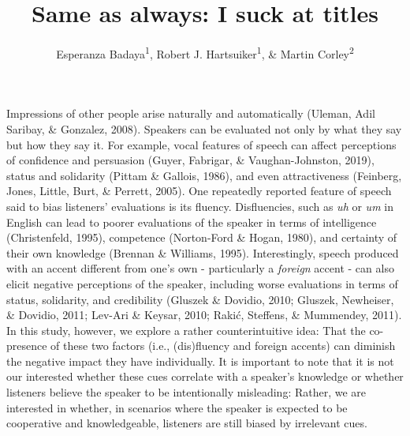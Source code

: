 \documentclass[
  man,floatsintext]{apa6}
\title{Same as always: I suck at titles}
\author{Esperanza Badaya\textsuperscript{1}, Robert J. Hartsuiker\textsuperscript{1}, \& Martin Corley\textsuperscript{2}}
\date{}
\affiliation{\vspace{0.5cm}\textsuperscript{1} Ghent University\\\textsuperscript{2} University of Edinburgh}
\begin{document}
\maketitle

Impressions of other people arise naturally and automatically (Uleman, Adil Saribay, \& Gonzalez, 2008). Speakers can be evaluated not only by what they say but how they say it. For example, vocal features of speech can affect perceptions of confidence and persuasion (Guyer, Fabrigar, \& Vaughan-Johnston, 2019), status and solidarity (Pittam \& Gallois, 1986), and even attractiveness (Feinberg, Jones, Little, Burt, \& Perrett, 2005). One repeatedly reported feature of speech said to bias listeners' evaluations is its fluency. Disfluencies, such as \emph{uh} or \emph{um} in English can lead to poorer evaluations of the speaker in terms of intelligence (Christenfeld, 1995), competence (Norton-Ford \& Hogan, 1980), and certainty of their own knowledge (Brennan \& Williams, 1995). Interestingly, speech produced with an accent different from one's own - particularly a \emph{foreign} accent - can also elicit negative perceptions of the speaker, including worse evaluations in terms of status, solidarity, and credibility (Gluszek \& Dovidio, 2010; Gluszek, Newheiser, \& Dovidio, 2011; Lev-Ari \& Keysar, 2010; Rakić, Steffens, \& Mummendey, 2011). In this study, however, we explore a rather counterintuitive idea: That the co-presence of these two factors (i.e., (dis)fluency and foreign accents) can diminish the negative impact they have individually. It is important to note that it is not our interested whether these cues correlate with a speaker's knowledge or whether listeners believe the speaker to be intentionally misleading: Rather, we are interested in whether, in scenarios where the speaker is expected to be cooperative and knowledgeable, listeners are still biased by irrelevant cues.
\end{document}
